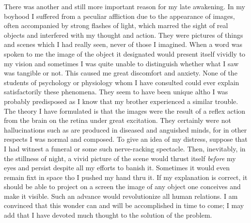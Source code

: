 \documentclass[a4paper,12pt,english,twoside,openright]{memoir}
\begin{document}
	There was another and still more important reason for my late awakening.  In my boyhood I 
	suffered from a peculiar affliction due to the appearance of images, often accompanied by strong 
	flashes of light, which marred the sight of real objects and interfered with my thought and action.  
	They were pictures of things and scenes which I had really seen, never of those I imagined.  
	When a word was spoken to me the image of the object it designated would present itself vividly 
	to my vision and sometimes I was quite unable to distinguish whether what I saw was tangible or 
	not.  This caused me great discomfort and anxiety.  None of the students of psychology or 
	physiology whom I have consulted could ever explain satisfactorily these phenomena.  They 
	seem to have been unique altho I was probably predisposed as I know that my brother 
	experienced a similar trouble.  The theory I have formulated is that the images were the result of 
	a reflex action from the brain on the retina under great excitation.  They certainly were not 
	hallucinations such as are produced in diseased and anguished minds, for in other respects I was 
	normal and composed.  To give an idea of my distress, suppose that I had witnest a funeral or 
	some such nerve-racking spectacle.  Then, inevitably, in the stillness of night, a vivid picture of 
	the scene would thrust itself \emph{before} my eyes and persist despite all my efforts to banish it.  
	Sometimes it would even remain fixt in space tho I pushed my hand thru it.  If my explanation is 
	correct, it should be able to project on a screen the image of any object one conceives and make 
	it visible.  Such an advance would revolutionize all human relations.
	I am convinced that this 
	wonder can and will be accomplished in time to come; I may add that I have devoted much thought to the solution of the problem.  	
	
\end{document}
